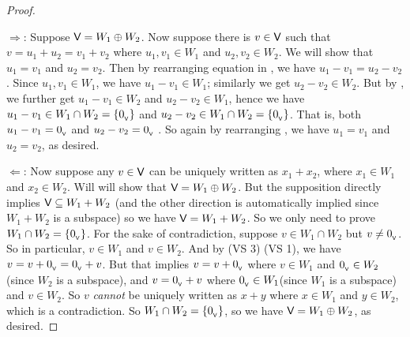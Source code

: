 \begin{proof}\ 

\(\Longrightarrow\): Suppose \(\textsf{V} = W_1 \oplus W_2\).
Now suppose there is \(v \in \textsf{V}\) such that \(v = u_1 + u_2 = v_1 + v_2\)  where \(u_1, v_1 \in W_1\) and \(u_2, v_2 \in W_2\).
We will show that \(u_1 = v_1\) and \(u_2 = v_2\).
Then by rearranging equation in , we have \(u_1 - v_1 = u_2 - v_2\) .
Since \(u_1, v_1 \in W_1\), we have \(u_1 - v_1 \in W_1\); similarly we get \(u_2 - v_2 \in W_2\).
But by , we further get \(u_1 - v_1 \in W_2\) and \(u_2 - v_2 \in W_1\), hence we have \(u_1 - v_1 \in W_1 \cap W_2 = \{ 0_{_{\textsf{V}}} \}\) and \(u_2 - v_2 \in W_1 \cap W_2 = \{ 0_{_{\textsf{V}}} \}\).
That is, both \(u_1 - v_1 = 0_{_{\textsf{V}}}\) and \(u_2 - v_2 = 0_{_{\textsf{V}}}\) .
So again by rearranging , we have \(u_1 = v_1\) and \(u_2 = v_2\), as desired.

\(\Longleftarrow\): Now suppose any \(v \in \textsf{V}\) can be uniquely written as \(x_1 + x_2\), where \(x_1 \in W_1\) and \(x_2 \in W_2\).
Will will show that \(\textsf{V} = W_1 \oplus W_2\).
But the supposition directly implies \(\textsf{V} \subseteq W_1 + W_2\) (and the other direction is automatically implied since \(W_1 + W_2\) is a subspace) so we have \(\textsf{V} = W_1 + W_2\).
So we only need to prove \(W_1 \cap W_2 = \{ 0_{_{\textsf{V}}} \}\).
For the sake of contradiction, suppose \(v \in W_1 \cap W_2\) but \(v \ne 0_{_{\textsf{V}}}\).
So in particular, \(v \in W_1\) and \(v \in W_2\).
And by (VS 3) (VS 1), we have \(v = v + 0_{_{\textsf{V}}} = 0_{_{\textsf{V}}} + v\).
But that implies \(v = v + 0_{_{\textsf{V}}}\) where \(v \in W_1\) and \(0_{_{\textsf{V}}} \in W_2\)(since \(W_2\) is a subspace), and \(v = 0_{_{\textsf{V}}} + v\) where \(0_{_{\textsf{V}}} \in W_1\)(since \(W_1\) is a subspace) and \(v \in W_2\).
So \(v\) \emph{cannot} be uniquely written as \(x + y\) where \(x \in W_1\) and \(y \in W_2\), which is a contradiction.
So \(W_1 \cap W_2 = \{ 0_{_{\textsf{V}}} \}\), so we have \(\textsf{V} = W_1 \oplus W_2\), as desired.
\end{proof}

